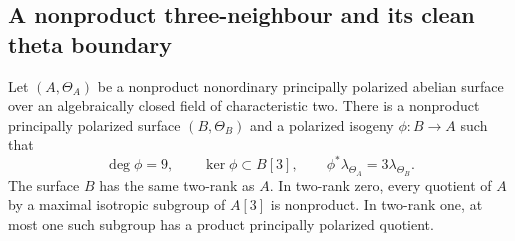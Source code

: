 \subsection{A nonproduct three-neighbour and its clean theta boundary}

\begin{lemma}
\label{lem:root-nonordinary-nonproduct-three-neighbor-candidate}
Let $(A,\Theta_A)$ be a nonproduct nonordinary principally polarized
abelian surface over an algebraically closed field of characteristic two.
There is a nonproduct principally polarized surface $(B,\Theta_B)$
and a polarized isogeny $\phi:B\to A$ such that
\[
 \deg\phi=9,\qquad \ker\phi\subset B[3],\qquad
 \phi^*\lambda_{\Theta_A}=3\lambda_{\Theta_B}.
\]
The surface $B$ has the same two-rank as $A$. In two-rank zero,
every quotient of $A$ by a maximal isotropic subgroup of $A[3]$
is nonproduct. In two-rank one, at most one such subgroup has a
product principally polarized quotient.
\end{lemma}
